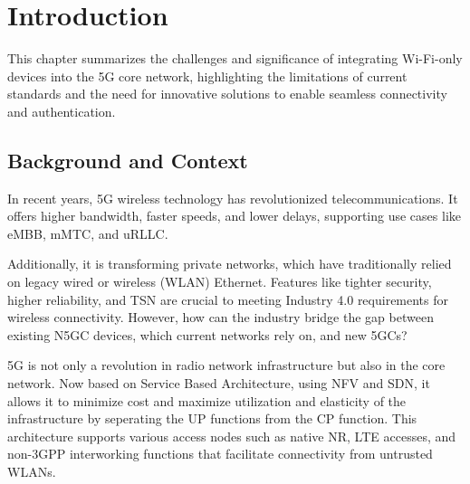 \chapter{Introduction}%
\label{chapter:introduction}

\begin{introduction}
This chapter summarizes the challenges and significance of integrating Wi-Fi-only devices into the 5G core network, highlighting the limitations of current standards and the need for innovative solutions to enable seamless connectivity and authentication.
\end{introduction}

\section{Background and Context}


In recent years, \ac{5G} wireless technology has revolutionized telecommunications. It offers higher bandwidth, faster speeds, and lower delays, supporting use cases like \ac{eMBB}, \ac{mMTC}, and \ac{uRLLC}.

Additionally, it is transforming private networks, which have traditionally relied on legacy wired or wireless (WLAN) Ethernet. Features like tighter security, higher reliability, and \ac{TSN} are crucial to meeting Industry 4.0 requirements for wireless connectivity. However, how can the industry bridge the gap between existing \ac{N5GC} devices, which current networks rely on, and new \acp{5GC}?


5G is not only a revolution in radio network infrastructure but also in the core network. Now based on Service Based Architecture, using \ac{NFV} and \ac{SDN}, it allows it to minimize cost and maximize utilization and elasticity of the infrastructure by seperating the \ac{UP} functions from the \ac{CP} function. This architecture supports various access nodes such as native \ac{NR}, LTE accesses, and non-\ac{3GPP} interworking functions that facilitate connectivity from untrusted WLANs.~\cite{23.501-p41}

